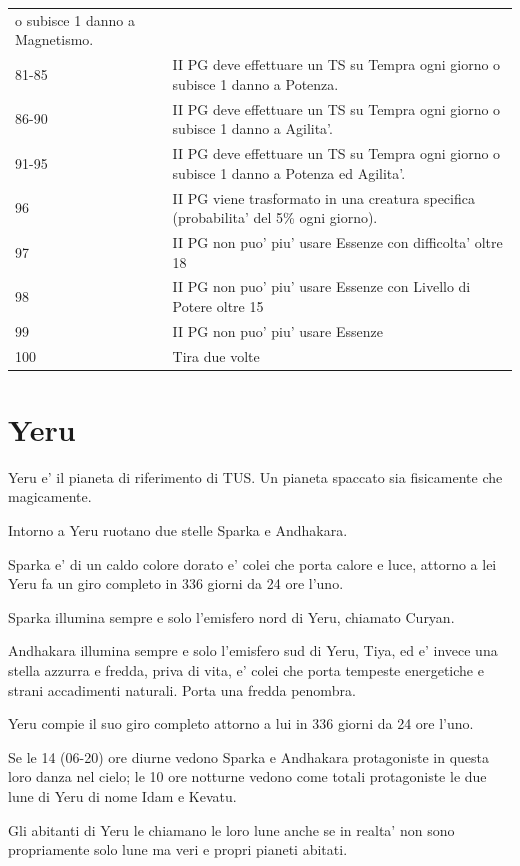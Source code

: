 \documentclass[a4paper,11pt,twoside,openany]{book}
\begin{document}
{\begin{tabular}{ll}
			o subisce 1 danno a Magnetismo.\tabularnewline
			81-85 & II PG deve effettuare un TS su Tempra ogni giorno
			o subisce 1 danno a Potenza.\tabularnewline
			86-90 & II PG deve effettuare un TS su Tempra ogni giorno
			o subisce 1 danno a Agilita'.\tabularnewline
			91-95 & II PG deve effettuare un TS su Tempra ogni giorno
			o subisce 1 danno a Potenza ed Agilita'.\tabularnewline
			96 & II PG viene trasformato in una creatura specifica (probabilita'
			del 5\% ogni giorno).\tabularnewline
			97 & II PG non puo' piu' usare Essenze con difficolta' oltre 18\tabularnewline
			98 & II PG non puo' piu' usare Essenze con Livello di Potere oltre
			15\tabularnewline
			99 & II PG non puo' piu' usare Essenze\tabularnewline
			100 & Tira due volte\tabularnewline
			
		\end{tabular}
		
		\pagebreak
		
		\section{Yeru}
		
		\label{yeru}
		
		Yeru e' il pianeta di riferimento di TUS. Un pianeta spaccato sia fisicamente che magicamente.
		
		Intorno a Yeru ruotano due stelle Sparka e Andhakara.
		
		Sparka e' di un caldo colore dorato e' colei che porta calore e luce, attorno a lei Yeru fa un giro completo in 336 giorni da 24 ore l'uno. 
		
		Sparka illumina sempre e solo l'emisfero nord di Yeru, chiamato Curyan.
		
		Andhakara illumina sempre e solo l'emisfero sud di Yeru, Tiya, ed e' invece una stella azzurra e fredda, priva di vita, e' colei che porta tempeste energetiche e strani accadimenti naturali. Porta una fredda penombra.
		
		Yeru compie il suo giro completo attorno a lui in 336 giorni da 24 ore l'uno.
		
		Se le 14 (06-20) ore diurne vedono Sparka e Andhakara protagoniste in questa loro danza nel cielo; le 10 ore notturne vedono come totali protagoniste le due lune di Yeru di nome Idam e Kevatu. 
		
		Gli abitanti di Yeru le chiamano le loro lune anche se in realta' non sono propriamente solo lune ma veri e propri pianeti abitati.
		
}
\end{document}
